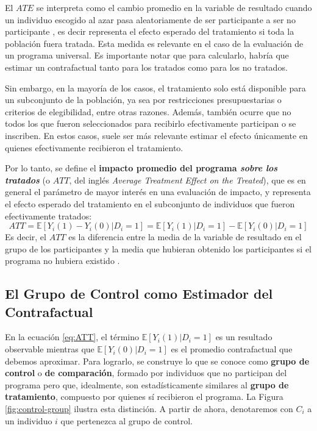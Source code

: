 \documentclass[../../main.tex]{subfiles}
\begin{document}
El \(ATE\) se interpreta como el cambio promedio en la variable de resultado cuando un individuo escogido al azar pasa aleatoriamente de ser participante a ser no participante \cite{bernal}, es decir representa el efecto esperado del tratamiento si toda la población fuera tratada. Esta medida es relevante en el caso de la evaluación de un programa universal. Es importante notar que para calcularlo, habría que estimar un contrafactual tanto para los tratados como para los no tratados.

Sin embargo, en la mayoría de los casos, el tratamiento solo está disponible para un subconjunto de la población, ya sea por restricciones presupuestarias o criterios de elegibilidad, entre otras razones. Además, también ocurre que no todos los que fueron seleccionados para recibirlo efectivamente participan o se inscriben. En estos casos, suele ser más relevante estimar el efecto únicamente en quienes efectivamente recibieron el tratamiento.

Por lo tanto, se define el \textbf{impacto promedio del programa \textit{sobre los tratados}} (o \(ATT\), del inglés \textit{Average Treatment Effect on the Treated}), que es en general el parámetro de mayor interés en una evaluación de impacto, y representa el efecto esperado del tratamiento en el subconjunto de individuos que fueron efectivamente tratados:
\begin{equation}
    ATT = \mathbb{E} \left[Y_i(1)-Y_i(0)|D_i=1\right] = \mathbb{E} \left[Y_i(1)|D_i=1\right] - \mathbb{E} \left[Y_i(0)|D_i=1\right]
    \label{eq:ATT}
\end{equation}
Es decir, el \(ATT\) es la diferencia entre la media de la variable de resultado en el grupo de los participantes y la media que hubieran obtenido los participantes si el programa no hubiera existido \cite{bernal}.

\subsection{El Grupo de Control como Estimador del Contrafactual}
En la ecuación \ref{eq:ATT}, el término \(\mathbb{E} \left[Y_i(1)|D_i=1\right]\) es un resultado observable mientras que \(\mathbb{E} \left[Y_i(0)|D_i=1\right]\) es el promedio contrafactual que debemos aproximar. Para lograrlo, se construye lo que se conoce como \textbf{grupo de control} o \textbf{de comparación}, formado por individuos que no participan del programa pero que, idealmente, son estadísticamente similares \cite{gertler-2016} al \textbf{grupo de tratamiento}, compuesto por quienes sí recibieron el programa. La Figura \ref{fig:control-group} ilustra esta distinción. A partir de ahora, denotaremos con \(C_i\) a un individuo \(i\) que pertenezca al grupo de control.
\end{document}

